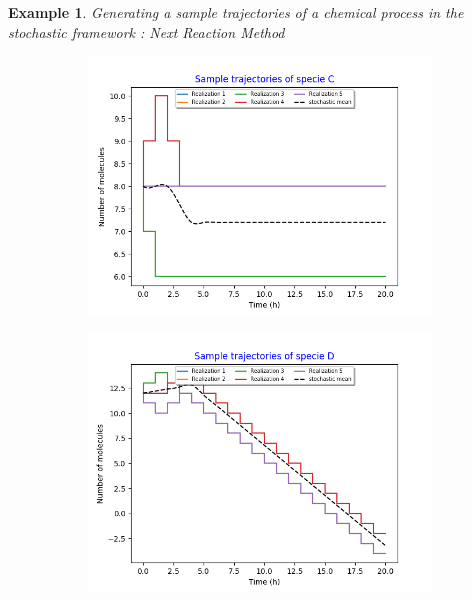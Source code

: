 \documentclass[11pt,a4paper]{article}
\newtheorem{example}[theorem]{Example}
\begin{document}
\begin{example}{Generating a sample trajectories of a chemical process in the stochastic framework : Next Reaction Method}
\begin{figure}[H]
    \centering
    \begin{subfigure}{.5\textwidth}
      \centering
        \includegraphics[width=1.1\linewidth]{Images/c.png}
        \label{fig: Single sample trajectory}
    \end{subfigure}%
    \begin{subfigure}{.5\textwidth}
      \centering
        \includegraphics[width=1.1\linewidth]{Images/d.png}
        \label{fig: Single sample trajectory}
    \end{subfigure}
    \centering
    \begin{subfigure}{.5\textwidth}
      \centering

\end{subfigure}
\end{figure}
\end{example}
\end{document}
